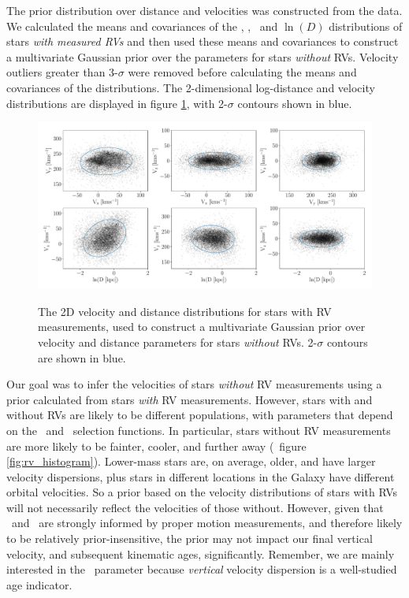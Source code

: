The prior distribution over distance and velocities was constructed from the
data.
We calculated the means and covariances of the \vx, \vy, \vz\ and $\ln(D)$
distributions of stars {\it with measured RVs} and then used these means and
covariances to construct a multivariate Gaussian prior over the parameters for
stars {\it without} RVs.
Velocity outliers greater than 3-$\sigma$ were removed before calculating the
means and covariances of the distributions.
The 2-dimensional log-distance and velocity distributions are displayed in
figure \ref{fig:prior_distributions_2D}, with 2-$\sigma$ contours shown in
blue.
\begin{figure}[ht!]
\caption{
The 2D velocity and distance distributions for stars with RV measurements,
    used to construct a multivariate Gaussian prior over velocity and
    distance parameters for stars {\it without} RVs.
2-$\sigma$ contours are shown in blue.
}
  \centering
    \includegraphics[width=1\textwidth]{prior_distributions_2D}
\label{fig:prior_distributions_2D}
\end{figure}

Our goal was to infer the velocities of stars {\it without} RV measurements
using a prior calculated from stars {\it with} RV measurements.
However, stars with and without RVs are likely to be different populations,
with parameters that depend on the \gaia\ and \lamost\ selection functions.
In particular, stars without RV measurements are more likely to be fainter,
cooler, and further away (\eg\ figure \ref{fig:rv_histogram}).
Lower-mass stars are, on average, older, and have larger velocity dispersions,
plus stars in different locations in the Galaxy have different orbital
velocities.
So a prior based on the velocity distributions of stars with RVs will not
necessarily reflect the velocities of those without.
However, given that \vx\ and \vz\ are strongly informed by proper motion
measurements, and therefore likely to be relatively prior-insensitive, the
prior may not impact our final vertical velocity, and subsequent kinematic
ages, significantly.
Remember, we are mainly interested in the \vz\ parameter because {\it
vertical} velocity dispersion is a well-studied age indicator.


